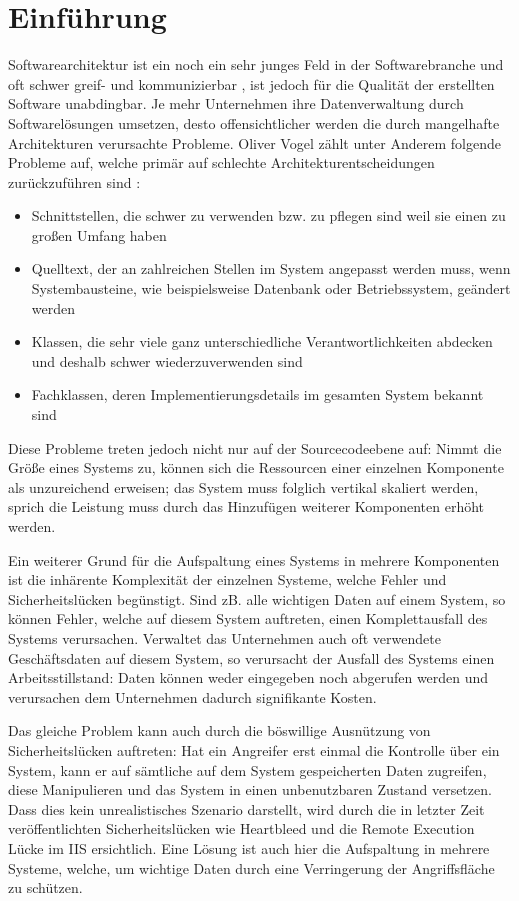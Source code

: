 \chapter{Einführung}
Softwarearchitektur ist ein noch ein sehr junges Feld in der Softwarebranche und oft schwer greif- und kommunizierbar \cite[S. 8]{softarch}, ist jedoch für die Qualität der erstellten Software unabdingbar. Je mehr Unternehmen ihre Datenverwaltung durch Softwarelösungen umsetzen, desto offensichtlicher werden die durch mangelhafte Architekturen verursachte Probleme. Oliver Vogel zählt unter Anderem folgende Probleme auf, welche primär auf schlechte Architekturentscheidungen zurückzuführen sind \cite[S. 7]{softarch}:

\begin{itemize}
  \item \glqq Schnittstellen, die schwer zu verwenden bzw. zu pflegen sind weil sie einen zu großen Umfang haben\grqq
  \item \glqq Quelltext, der an zahlreichen Stellen im System angepasst werden muss, wenn Systembausteine, wie beispielsweise Datenbank oder Betriebssystem, geändert werden\grqq
  \item \glqq Klassen, die sehr viele ganz unterschiedliche Verantwortlichkeiten abdecken und deshalb schwer wiederzuverwenden sind\grqq
  \item \glqq Fachklassen, deren Implementierungsdetails im gesamten System bekannt sind\grqq
\end{itemize}

Diese Probleme treten jedoch nicht nur auf der Sourcecodeebene auf: Nimmt die Größe eines Systems zu, können sich die Ressourcen einer einzelnen Komponente als unzureichend erweisen; das System muss folglich vertikal skaliert werden, sprich die Leistung muss durch das Hinzufügen weiterer Komponenten erhöht werden.

Ein weiterer Grund für die Aufspaltung eines Systems in mehrere Komponenten ist die inhärente Komplexität der einzelnen Systeme, welche Fehler und Sicherheitslücken begünstigt. Sind zB. alle wichtigen Daten auf einem System, so können Fehler, welche auf diesem System auftreten, einen Komplettausfall des Systems verursachen. Verwaltet das Unternehmen auch oft verwendete Geschäftsdaten auf diesem System, so verursacht der Ausfall des Systems einen Arbeitsstillstand: Daten können weder eingegeben noch abgerufen werden und verursachen dem Unternehmen dadurch signifikante Kosten.

Das gleiche Problem kann auch durch die böswillige Ausnützung von Sicherheitslücken auftreten: Hat ein Angreifer erst einmal die Kontrolle über ein System, kann er auf sämtliche auf dem System gespeicherten Daten zugreifen, diese Manipulieren und das System in einen unbenutzbaren Zustand versetzen. Dass dies kein unrealistisches Szenario darstellt, wird durch die in letzter Zeit veröffentlichten Sicherheitslücken wie Heartbleed\cite{heartbleed} und die Remote Execution Lücke im IIS ersichtlich\cite{iis}. Eine Lösung ist auch hier die Aufspaltung in mehrere Systeme, welche, um wichtige Daten durch eine Verringerung der Angriffsfläche zu schützen.

